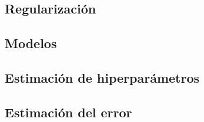 \documentclass[a4paper, 20pt]{article}
\begin{document}
\subsection{Regularización}

\subsection{Modelos}


\subsection{Estimación de hiperparámetros}

\subsection{Estimación del error}
\end{document}
